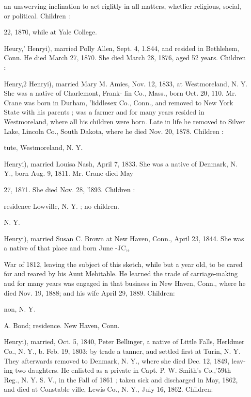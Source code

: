 \documentclass[oneside]{book}
\begin{document}
an unswerving inclination to act riglitly in all matters, whetlier 
religious, social, or political. Children : 



22, 1870, while at Yale College. 

Heury,' Henryi), married Polly Allen, Sept. 4, 1.S44, and resided 
in Bethlehem, Conn. He died March 27, 1870. She died March 
28, 1876, aged 52 years. Children : 


Henry,2 Henryi), married Mary M. Amies, Nov. 12, 1833, at 
Westmoreland, N. Y. She was a native of Charlemont, Frank- 
lin Co., Mass., born Oct. 20, 110. Mr. Crane was born in 
Durham, 'liddlesex Co., Conn., and removed to New York State 
with his parents ; was a farmer and for many years resided in 
Westmoreland, where all his children were born. Late in life he 
removed to Silver Lake, Lincoln Co., South Dakota, where he 
died Nov. 20, 1878. Children : 


tute, Westmoreland, N. Y. 



Henryi), married Louisa Nash, April 7, 1833. She was a native 
of Denmark, N. Y., born Aug. 9, 1811. Mr. Crane died May 

27, 1871. She died Nov. 28, 'l893. Children : 




residence Lowville, N. Y. ; no children. 

N. Y. 

Henryi), married Susan C. Brown at New Haven, Conn., April 
23, 1844. She was a native of that place and born June -JC,, 




War of 1812, leaving the subject of this sketch, while but a year 
old, to be cared for aud reared by his Aunt Mehitable. He 
learned the trade of carriage-making aud for many years was 
engaged in that business in New Haven, Conn., where he died 
Nov. 19, 1888; and his wife April 29, 1889. Children: 

non, N. Y. 


A. Bond; residence. New Haven, Conn. 


Henryi), married, Oct. 5, 1840, Peter Bellinger, a native of 
Little Falls, Herldmer Co., N. Y., b. Feb. 19, 1803; by trade a 
tanner, aud settled first at Turin, N. Y. They afterwards 
removed to Denmark, N. Y., where she died Dec. 12, 1849, leav- 
ing two daughters. He enlisted as a private in Capt. P. W. 
Smith's Co.,'59th Reg., N. Y. S. V., in the Fall of 1861 ; taken 
sick and discharged in May, 1862, and died at Constable ville, 
Lewis Co., N. Y., July 16, 1862. Children: 
\end{document}
